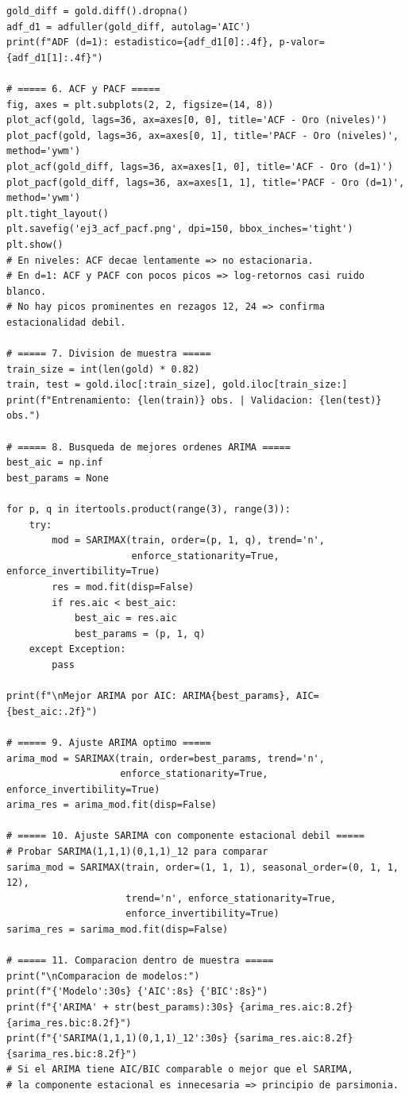 \documentclass[12pt,a4paper]{article}
\theoremstyle{definition}
\begin{document}
\begin{lstlisting}[style=python, caption={Ejemplo 3: Comparacion ARIMA vs.\ SARIMA - Oro}]
gold_diff = gold.diff().dropna()
adf_d1 = adfuller(gold_diff, autolag='AIC')
print(f"ADF (d=1): estadistico={adf_d1[0]:.4f}, p-valor={adf_d1[1]:.4f}")

# ===== 6. ACF y PACF =====
fig, axes = plt.subplots(2, 2, figsize=(14, 8))
plot_acf(gold, lags=36, ax=axes[0, 0], title='ACF - Oro (niveles)')
plot_pacf(gold, lags=36, ax=axes[0, 1], title='PACF - Oro (niveles)', method='ywm')
plot_acf(gold_diff, lags=36, ax=axes[1, 0], title='ACF - Oro (d=1)')
plot_pacf(gold_diff, lags=36, ax=axes[1, 1], title='PACF - Oro (d=1)', method='ywm')
plt.tight_layout()
plt.savefig('ej3_acf_pacf.png', dpi=150, bbox_inches='tight')
plt.show()
# En niveles: ACF decae lentamente => no estacionaria.
# En d=1: ACF y PACF con pocos picos => log-retornos casi ruido blanco.
# No hay picos prominentes en rezagos 12, 24 => confirma estacionalidad debil.

# ===== 7. Division de muestra =====
train_size = int(len(gold) * 0.82)
train, test = gold.iloc[:train_size], gold.iloc[train_size:]
print(f"Entrenamiento: {len(train)} obs. | Validacion: {len(test)} obs.")

# ===== 8. Busqueda de mejores ordenes ARIMA =====
best_aic = np.inf
best_params = None

for p, q in itertools.product(range(3), range(3)):
    try:
        mod = SARIMAX(train, order=(p, 1, q), trend='n',
                      enforce_stationarity=True, enforce_invertibility=True)
        res = mod.fit(disp=False)
        if res.aic < best_aic:
            best_aic = res.aic
            best_params = (p, 1, q)
    except Exception:
        pass

print(f"\nMejor ARIMA por AIC: ARIMA{best_params}, AIC={best_aic:.2f}")

# ===== 9. Ajuste ARIMA optimo =====
arima_mod = SARIMAX(train, order=best_params, trend='n',
                    enforce_stationarity=True, enforce_invertibility=True)
arima_res = arima_mod.fit(disp=False)

# ===== 10. Ajuste SARIMA con componente estacional debil =====
# Probar SARIMA(1,1,1)(0,1,1)_12 para comparar
sarima_mod = SARIMAX(train, order=(1, 1, 1), seasonal_order=(0, 1, 1, 12),
                     trend='n', enforce_stationarity=True,
                     enforce_invertibility=True)
sarima_res = sarima_mod.fit(disp=False)

# ===== 11. Comparacion dentro de muestra =====
print("\nComparacion de modelos:")
print(f"{'Modelo':30s} {'AIC':8s} {'BIC':8s}")
print(f"{'ARIMA' + str(best_params):30s} {arima_res.aic:8.2f} {arima_res.bic:8.2f}")
print(f"{'SARIMA(1,1,1)(0,1,1)_12':30s} {sarima_res.aic:8.2f} {sarima_res.bic:8.2f}")
# Si el ARIMA tiene AIC/BIC comparable o mejor que el SARIMA,
# la componente estacional es innecesaria => principio de parsimonia.


\end{lstlisting}
\end{document}
